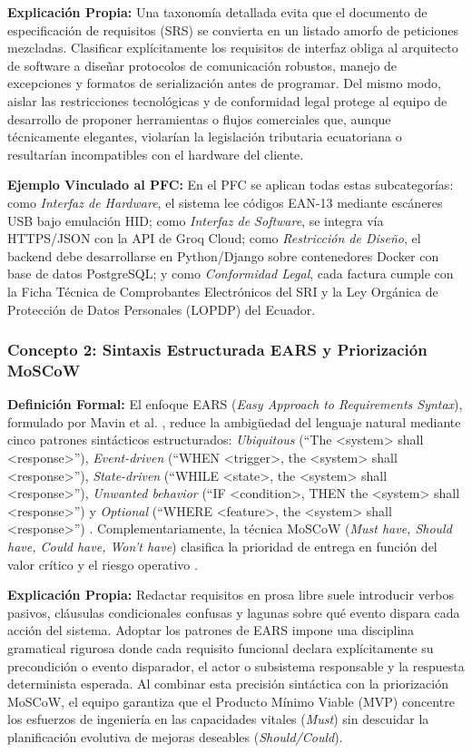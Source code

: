 \textbf{Explicación Propia:} Una taxonomía detallada evita que el documento de especificación de requisitos (SRS) se convierta en un listado amorfo de peticiones mezcladas. Clasificar explícitamente los requisitos de interfaz obliga al arquitecto de software a diseñar protocolos de comunicación robustos, manejo de excepciones y formatos de serialización antes de programar. Del mismo modo, aislar las restricciones tecnológicas y de conformidad legal protege al equipo de desarrollo de proponer herramientas o flujos comerciales que, aunque técnicamente elegantes, violarían la legislación tributaria ecuatoriana o resultarían incompatibles con el hardware del cliente.

\textbf{Ejemplo Vinculado al PFC:} En el PFC se aplican todas estas subcategorías: como \textit{Interfaz de Hardware}, el sistema lee códigos EAN-13 mediante escáneres USB bajo emulación HID; como \textit{Interfaz de Software}, se integra vía HTTPS/JSON con la API de Groq Cloud; como \textit{Restricción de Diseño}, el backend debe desarrollarse en Python/Django sobre contenedores Docker con base de datos PostgreSQL; y como \textit{Conformidad Legal}, cada factura cumple con la Ficha Técnica de Comprobantes Electrónicos del SRI y la Ley Orgánica de Protección de Datos Personales (LOPDP) del Ecuador.

\subsubsection{Concepto 2: Sintaxis Estructurada EARS y Priorización MoSCoW}
\textbf{Definición Formal:} El enfoque EARS (\textit{Easy Approach to Requirements Syntax}), formulado por Mavin et al. \cite{mavin2009ears}, reduce la ambigüedad del lenguaje natural mediante cinco patrones sintácticos estructurados: \textit{Ubiquitous} (``The <system> shall <response>''), \textit{Event-driven} (``WHEN <trigger>, the <system> shall <response>''), \textit{State-driven} (``WHILE <state>, the <system> shall <response>''), \textit{Unwanted behavior} (``IF <condition>, THEN the <system> shall <response>'') y \textit{Optional} (``WHERE <feature>, the <system> shall <response>'') \cite{mavin2009ears}. Complementariamente, la técnica MoSCoW (\textit{Must have, Should have, Could have, Won't have}) clasifica la prioridad de entrega en función del valor crítico y el riesgo operativo \cite{ireb2023, wiegers2013}.

\textbf{Explicación Propia:} Redactar requisitos en prosa libre suele introducir verbos pasivos, cláusulas condicionales confusas y lagunas sobre qué evento dispara cada acción del sistema. Adoptar los patrones de EARS impone una disciplina gramatical rigurosa donde cada requisito funcional declara explícitamente su precondición o evento disparador, el actor o subsistema responsable y la respuesta determinista esperada. Al combinar esta precisión sintáctica con la priorización MoSCoW, el equipo garantiza que el Producto Mínimo Viable (MVP) concentre los esfuerzos de ingeniería en las capacidades vitales (\textit{Must}) sin descuidar la planificación evolutiva de mejoras deseables (\textit{Should/Could}).

